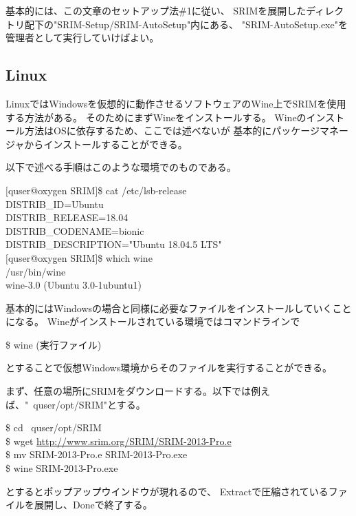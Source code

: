 \documentclass [11pt,a4paper,dvipdfmx] {jarticle}
\begin{document}
基本的には、この文章のセットアップ法\#1に従い、
SRIMを展開したディレクトリ配下の"SRIM-Setup/SRIM-AutoSetup"内にある、
"SRIM-AutoSetup.exe"を管理者として実行していけばよい。


\subsection{Linux}
LinuxではWindowsを仮想的に動作させるソフトウェアのWine上でSRIMを使用する方法がある。
そのためにまずWineをインストールする。
Wineのインストール方法はOSに依存するため、ここでは述べないが
基本的にパッケージマネージャからインストールすることができる。

以下で述べる手順はこのような環境でのものである。
\begin{screen}[4]
    $[$quser@oxygen SRIM$]$\$ cat /etc/lsb-release \\
    DISTRIB\_ID=Ubuntu \\
    DISTRIB\_RELEASE=18.04 \\
    DISTRIB\_CODENAME=bionic \\
    DISTRIB\_DESCRIPTION="Ubuntu 18.04.5 LTS" \\
    $[$quser@oxygen SRIM$]$\$ which wine \\
    /usr/bin/wine \\
    wine-3.0 (Ubuntu 3.0-1ubuntu1) 
\end{screen}

基本的にはWindowsの場合と同様に必要なファイルをインストールしていくことになる。
Wineがインストールされている環境ではコマンドラインで
\begin{screen}[4]
    \$ wine (実行ファイル)
\end{screen}
とすることで仮想Windows環境からそのファイルを実行することができる。

まず、任意の場所にSRIMをダウンロードする。以下では例えば、"~quser/opt/SRIM"とする。

\begin{screen}[4]
    \$ cd ~quser/opt/SRIM \\
    \$ wget \url{http://www.srim.org/SRIM/SRIM-2013-Pro.e} \\
    \$ mv SRIM-2013-Pro.e SRIM-2013-Pro.exe \\
    \$ wine SRIM-2013-Pro.exe 
\end{screen}
とするとポップアップウインドウが現れるので、
Extractで圧縮されているファイルを展開し、Doneで終了する。
\end{document}
